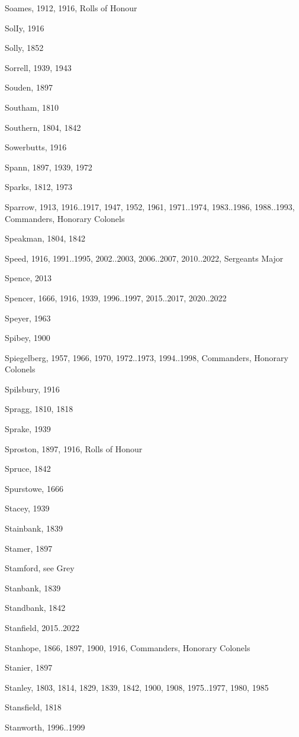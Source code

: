 {\begin{theindex}
\item Soames, 1912, 1916, Rolls of Honour
\item SolIy, 1916
\item Solly, 1852
\item Sorrell, 1939, 1943
\item Souden, 1897
\item Southam, 1810
\item Southern, 1804, 1842
\item Sowerbutts, 1916
\item Spann, 1897, 1939, 1972
\item Sparks, 1812, 1973
\item Sparrow, 1913, 1916..1917, 1947, 1952, 1961, 1971..1974, 1983..1986, 1988..1993, Commanders, Honorary Colonels
\item Speakman, 1804, 1842
\item Speed, 1916, 1991..1995, 2002..2003, 2006..2007, 2010..2022, Sergeants Major
\item Spence, 2013
\item Spencer, 1666, 1916, 1939, 1996..1997, 2015..2017, 2020..2022
\item Speyer, 1963
\item Spibey, 1900
\item Spiegelberg, 1957, 1966, 1970, 1972..1973, 1994..1998, Commanders, Honorary Colonels
\item Spilsbury, 1916
\item Spragg, 1810, 1818
\item Sprake, 1939
\item Sproston, 1897, 1916, Rolls of Honour
\item Spruce, 1842
\item Spurstowe, 1666
\item Stacey, 1939
\item Stainbank, 1839
\item Stamer, 1897
\item Stamford, see Grey
\item Stanbank, 1839
\item Standbank, 1842
\item Stanfield, 2015..2022
\item Stanhope, 1866, 1897, 1900, 1916, Commanders, Honorary Colonels
\item Stanier, 1897
\item Stanley, 1803, 1814, 1829, 1839, 1842, 1900, 1908, 1975..1977, 1980, 1985
\item Stansfield, 1818
\item Stanworth, 1996..1999

\end{theindex}}
